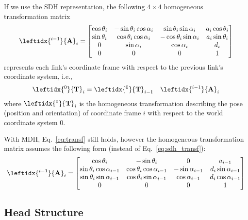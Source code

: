 If we use the \ac{SDH} representation, the following $4 \times 4$ homogeneous transformation matrix
%
\begin{equation}
\label{eq:sdh_transf}
\leftidx{^{i-1}}{\mathbf{A}}_i = 
\begin{bmatrix}
\cos\theta_i & -\sin\theta_i \cos\alpha_i & \sin\theta_i \sin\alpha_i & a_i \cos\theta_i \\
\sin\theta_i & \cos\theta_i \cos\alpha_i & -\cos\theta_i \sin\alpha_i & a_i \sin\theta_i \\
0 & \sin\alpha_i & \cos\alpha_i & d_i \\
0 & 0 & 0 & 1
\end{bmatrix}
\end{equation}
%
represents each link's coordinate frame with respect to the previous link's coordinate system, i.e.,
\begin{equation}\label{eq:transf}
\leftidx{^0}{\mathbf{T}}_i = \leftidx{^0}{\mathbf{T}}_{i-1} \quad \leftidx{^{i-1}}{\mathbf{A}}_i
\end{equation}
where $\leftidx{^0}{\mathbf{T}}_i$ is the homogeneous transformation describing the pose (position and orientation) of coordinate frame $i$ with respect to the world coordinate system $0$.


With \ac{MDH}, Eq.~\ref{eq:transf} still holds, however the homogeneous transformation matrix assumes the following form (instead of Eq.~\ref{eq:sdh_transf}):
%
\begin{equation}\label{eq:mdh_transf}
\leftidx{^{i-1}}{\mathbf{A}}_i = 
\begin{bmatrix}
\cos\theta_i & -\sin\theta_i & 0 & a_{i-1} \\
\sin\theta_i \cos\alpha_{i-1} & \cos\theta_i \cos\alpha_{i-1} & -\sin\alpha_{i-1} & d_i \sin\alpha_{i-1} \\
\sin\theta_i \sin\alpha_{i-1} & \cos\theta_i \sin\alpha_{i-1} & \cos\alpha_{i-1} & d_i \cos\alpha_{i-1} \\
0 & 0 & 0 & 1
\end{bmatrix}
\end{equation}




\subsection{Head Structure}
\label{sec:balta_head} 

